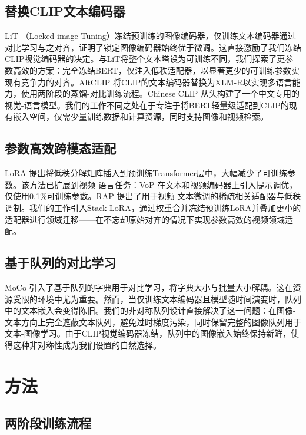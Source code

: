 \documentclass[10pt,a4paper]{ctexart}
\begin{document}
\subsection{替换CLIP文本编码器}

LiT \citep{zhai2022lit}（Locked-image Tuning）冻结预训练的图像编码器，仅训练文本编码器通过对比学习与之对齐，证明了锁定图像编码器始终优于微调。这直接激励了我们冻结CLIP视觉编码器的决定。与LiT将整个文本塔设为可训练不同，我们探索了更参数高效的方案：完全冻结BERT，仅注入低秩适配器，以显著更少的可训练参数实现有竞争力的对齐。AltCLIP \citep{chen2022altclip}将CLIP的文本编码器替换为XLM-R以实现多语言能力，使用两阶段的蒸馏-对比训练流程。Chinese CLIP \citep{yang2022chinese}从头构建了一个中文专用的视觉-语言模型。我们的工作不同之处在于专注于将BERT轻量级适配到CLIP的现有嵌入空间，仅需少量训练数据和计算资源，同时支持图像和视频检索。

\subsection{参数高效跨模态适配}

LoRA \citep{hu2022lora}提出将低秩分解矩阵插入到预训练Transformer层中，大幅减少了可训练参数。该方法已扩展到视频-语言任务：VoP \citep{huang2023vop}在文本和视频编码器上引入提示调优，仅使用0.1\%可训练参数。RAP \citep{cao2024acl}提出了用于视频-文本微调的稀疏相关适配器与低秩调制。我们的工作引入Stack LoRA，通过权重合并冻结预训练LoRA并叠加更小的适配器进行领域迁移——在不忘却原始对齐的情况下实现参数高效的视频领域适配。

\subsection{基于队列的对比学习}

MoCo \citep{he2020moco}引入了基于队列的字典用于对比学习，将字典大小与批量大小解耦。这在资源受限的环境中尤为重要。然而，当仅训练文本编码器且模型随时间演变时，队列中的文本嵌入会变得陈旧。我们的非对称队列设计直接解决了这一问题：在图像-文本方向上完全遮蔽文本队列，避免过时梯度污染，同时保留完整的图像队列用于文本-图像学习。由于CLIP视觉编码器冻结，队列中的图像嵌入始终保持新鲜，使得这种非对称性成为我们设置的自然选择。

\section{方法}

\subsection{两阶段训练流程}
\end{document}
